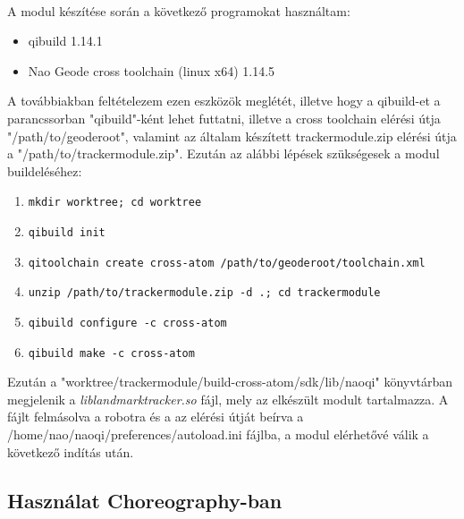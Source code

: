 \documentclass{article}
\numberwithin{figure}{section}
\newenvironment{compactlist}
{ \begin{itemize}
    \setlength{\itemsep}{0pt}
    \setlength{\parskip}{0pt}
    \setlength{\parsep}{0pt}
	\setlength{\topsep}{0pt}
}
{ \end{itemize}}
\newenvironment{compactnumbered}
{ \begin{enumerate}
    \setlength{\itemsep}{0pt}
    \setlength{\parskip}{0pt}
    \setlength{\parsep}{0pt}
	\setlength{\topsep}{0pt}
}
{ \end{enumerate}}
\begin{document}
\begin{sloppypar}
		\paragraph{}
		A modul készítése során a következő programokat használtam:
		\begin{compactlist}
			\item qibuild 1.14.1
			\item Nao Geode cross toolchain (linux x64) 1.14.5
		\end{compactlist}
		A továbbiakban feltételezem ezen eszközök meglétét, illetve hogy a qibuild-et a parancssorban "qibuild"-ként lehet futtatni, illetve a cross toolchain elérési útja "/path/to/geoderoot", valamint az általam készített trackermodule.zip elérési útja a "/path/to/trackermodule.zip". Ezután az alábbi lépések szükségesek a modul buildeléséhez:
		\begin{compactnumbered}
			\item \begin{verbatim}mkdir worktree; cd worktree\end{verbatim}
			\item \begin{verbatim}qibuild init \end{verbatim}
			\item \begin{verbatim}qitoolchain create cross-atom /path/to/geoderoot/toolchain.xml\end{verbatim}
			\item \begin{verbatim}unzip /path/to/trackermodule.zip -d .; cd trackermodule\end{verbatim}
			\item \begin{verbatim}qibuild configure -c cross-atom\end{verbatim}
			\item \begin{verbatim}qibuild make -c cross-atom\end{verbatim}
		\end{compactnumbered}
		\par Ezután a "worktree/trackermodule/build-cross-atom/sdk/lib/naoqi" könyvtárban megjelenik a \textit{liblandmarktracker.so} fájl, mely az elkészült modult tartalmazza. A fájlt felmásolva a robotra és a az elérési útját beírva a /home/nao/naoqi/preferences/autoload.ini fájlba, a modul elérhetővé válik a következő indítás után.		
		\subsection{Használat Choreography-ban}

\end{sloppypar}
\end{document}
